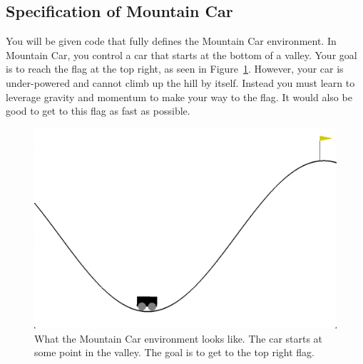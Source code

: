 \documentclass[11pt,addpoints,answers]{exam}
\begin{document}
\begin{center}
\end{center}

\subsection{Specification of Mountain Car}
You will be given code that fully defines the Mountain Car environment. In Mountain Car, you control a car that starts at the bottom of a valley. Your goal is to reach the flag at the top right, as seen in Figure~\ref{fig:mountaincar}. However, your car is under-powered and cannot climb up the hill by itself. Instead you must learn to leverage gravity and momentum to make your way to the flag. It would also be good to get to this flag as fast as possible.

\begin{figure}[H]
    \centering
    \includegraphics[width=0.5\linewidth]{figs/MountainCar.png}
    \caption{What the Mountain Car environment looks like. The car starts at some point in the valley. The goal is to get to the top right flag.}
    \label{fig:mountaincar}
\end{figure}
\end{document}
